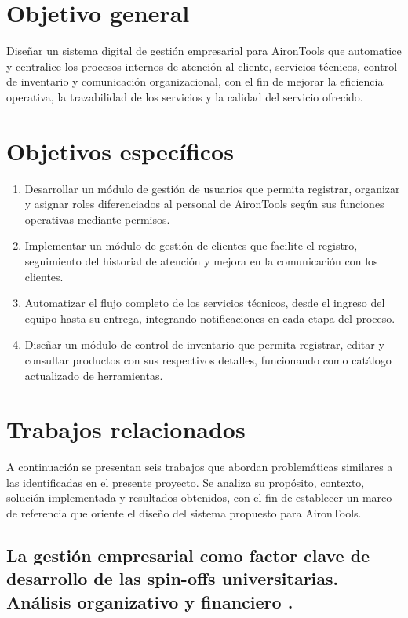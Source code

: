 \section{Objetivo general}
Diseñar un sistema digital de gestión empresarial para AironTools que automatice y centralice los procesos internos de atención al cliente, servicios técnicos, control de inventario y comunicación organizacional, con el fin de mejorar la eficiencia operativa, la trazabilidad de los servicios y la calidad del servicio ofrecido.

\section{Objetivos específicos}
\begin{enumerate}
	\item Desarrollar un módulo de gestión de usuarios que permita registrar, organizar y asignar roles diferenciados al personal de AironTools según sus funciones operativas mediante permisos.

	\item Implementar un módulo de gestión de clientes que facilite el registro, seguimiento del historial de atención y mejora en la comunicación con los clientes.

	\item Automatizar el flujo completo de los servicios técnicos, desde el ingreso del equipo hasta su entrega, integrando notificaciones en cada etapa del proceso.

	\item Diseñar un módulo de control de inventario que permita registrar, editar y consultar productos con sus respectivos detalles, funcionando como catálogo actualizado de herramientas.
\end{enumerate}

\section{Trabajos relacionados}

A continuación se presentan seis trabajos que abordan problemáticas similares a las identificadas en el presente proyecto. Se analiza su propósito, contexto, solución implementada y resultados obtenidos, con el fin de establecer un marco de referencia que oriente el diseño del sistema propuesto para AironTools.

\subsection{La gestión empresarial como factor clave de desarrollo de las spin-offs universitarias. Análisis organizativo y financiero \cite{Rodeiro2012}.}


